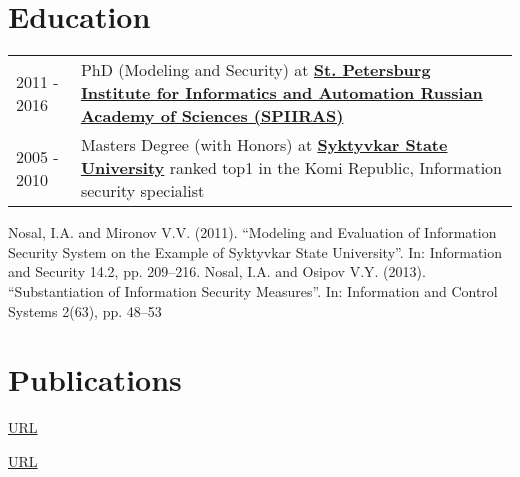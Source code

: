 \documentclass[a4paper,12pt]{article}
\begin{document}
\section{Education}
\begin{tabularx}{\linewidth}{@{}l X@{}}
2011 - 2016 & PhD (Modeling and Security) at \textbf{\href{http://www.spiiras.nw.ru/en/}{St. Petersburg Institute for Informatics and Automation Russian Academy of Sciences (SPIIRAS)}} \\

2005 - 2010 & Masters Degree (with Honors) at \textbf{\href{https://en.syktsu.ru/}{Syktyvkar State University}} ranked top1 in the Komi Republic, Information security specialist \hfill  \\
\end{tabularx}

Nosal, I.A. and Mironov V.V. (2011). “Modeling and Evaluation of Information Security System on the
Example of Syktyvkar State University”. In: Information and Security 14.2, pp. 209–216.
Nosal, I.A. and Osipov V.Y. (2013). “Substantiation of Information Security Measures”. In: Information
and Control Systems 2(63), pp. 48–53


\section{Publications}

\begin{refsection}
\nocite{nosal2011modeling}
\printbibliography[heading=none]
\end{refsection}
\href{https://scholar.google.com/citations?view_op=view_citation&hl=ru&user=g1m_ATEAAAAJ&citation_for_view=g1m_ATEAAAAJ:d1gkVwhDpl0C}{URL}

\begin{refsection}
\nocite{nosal2013substantiation}
\printbibliography[heading=none]
\end{refsection}

\href{https://www.researchgate.net/publication/260185876_Substantiation_of_Information_Security_Measure}{URL}


\end{document}
